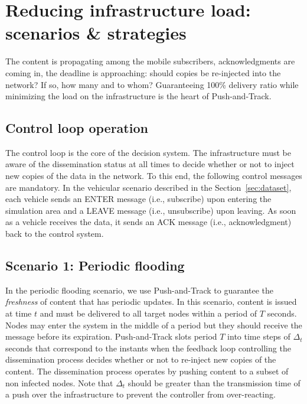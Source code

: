\documentclass[preprint]{elsarticle}
\begin{document}
\section{Reducing infrastructure load: scenarios \& strategies}
\label{sec:strategies}

The content is propagating among the mobile subscribers, acknowledgments are coming in, the deadline is approaching: should copies be re-injected into the network? If so, how many and to whom? Guaranteeing 100\% delivery ratio while minimizing the load on the infrastructure is the heart of Push-and-Track. 

\subsection{Control loop operation}
\label{subsec:control-loop}

The control loop is the core of the decision system. The infrastructure must be aware of the dissemination status at all times to decide whether or not to inject new copies of the data in the network. To this end, the following control messages are mandatory. In the vehicular scenario described in the Section~\ref{sec:dataset}, each vehicle sends an \textsf{ENTER} message (i.e., subscribe) upon entering the simulation area and a \textsf{LEAVE} message (i.e., unsubscribe) upon leaving. As soon as a vehicle receives the data, it sends an \textsf{ACK} message (i.e., acknowledgment) back to the control system.

\subsection{Scenario 1: Periodic flooding}
\label{subsec:periodic_scenario}

In the periodic flooding scenario, we use Push-and-Track to guarantee the \emph{freshness} of content that has periodic updates. In this scenario, content is issued at time $t$ and must be delivered to all target nodes within a period of $T$ seconds. Nodes may enter the system in the middle of a period but they should receive the message before its expiration. Push-and-Track slots period $T$ into time steps of $\Delta_t$ seconds that correspond to the instants when the feedback loop controlling the dissemination process decides whether or not to re-inject new copies of the content. The dissemination process operates by pushing content to a subset of non infected nodes. Note that $\Delta_t$ should be greater than the transmission time of a push over the infrastructure to prevent the controller from over-reacting.
\end{document}

